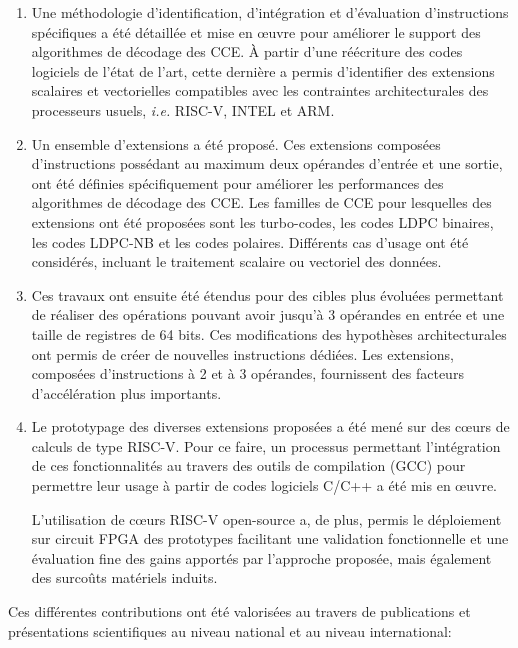 \documentclass[../main.tex]{subfiles}
\begin{document}
\begin{enumerate}

\item Une méthodologie d’identification, d’intégration et d’évaluation d'instructions spécifiques a été détaillée et mise en œuvre pour améliorer le support des algorithmes de décodage des CCE. À partir d’une réécriture des codes logiciels de l’état de l’art, cette dernière a permis d’identifier des extensions scalaires et vectorielles compatibles avec les contraintes architecturales des processeurs usuels, \textit{i.e.} RISC-V, INTEL et ARM.

\item Un ensemble d’extensions a été proposé. Ces extensions composées d’instructions possédant au maximum deux opérandes d’entrée et une sortie, ont été définies spécifiquement pour améliorer les performances des algorithmes de décodage des CCE. Les familles de CCE pour lesquelles des extensions ont été proposées sont les turbo-codes, les codes LDPC binaires, les codes LDPC-NB et les codes polaires. Différents cas d’usage ont été considérés, incluant le traitement scalaire ou vectoriel des données.

\item Ces travaux ont ensuite été étendus pour des cibles plus évoluées permettant de réaliser des opérations pouvant avoir jusqu’à 3 opérandes en entrée et une taille de registres de 64 bits. Ces modifications des hypothèses architecturales ont permis de créer de nouvelles instructions dédiées. Les extensions, composées d’instructions à 2 et à 3 opérandes, fournissent des facteurs d’accélération plus importants.

\item Le prototypage des diverses extensions proposées a été mené sur des cœurs de calculs de type RISC-V.
Pour ce faire, un processus permettant l'intégration de ces fonctionnalités au travers des outils de compilation (GCC) pour permettre leur usage à partir de codes logiciels C/C++ a été mis en œuvre.

L’utilisation de cœurs RISC-V open-source a, de plus, permis le déploiement sur circuit FPGA des prototypes facilitant une validation fonctionnelle et une évaluation fine des gains apportés par l’approche proposée, mais également des surcoûts matériels induits.

\end{enumerate}

Ces différentes contributions ont été valorisées au travers de publications et présentations scientifiques au niveau national et au niveau international:
\end{document}
